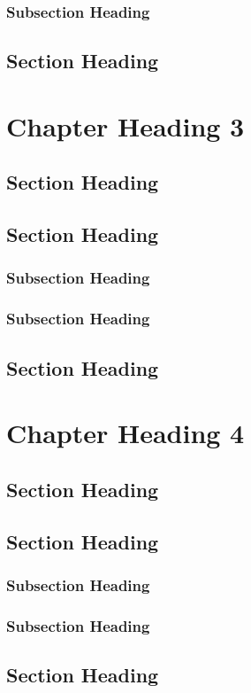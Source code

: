 \documentclass[teachingmaterial]{aaltoseries}
\begin{document}
\subsection{Subsection Heading}
\lipsum[9-10]
\section{Section Heading}
\lipsum[11-12]

\chapter[Alternative Chapter 3 Heading]{Chapter Heading 3}
\section{Section Heading}
\lipsum[1-4]
\section{Section Heading}
\lipsum[5-6]
\subsection{Subsection Heading}
\lipsum[7-8]
\subsection{Subsection Heading}
\lipsum[9-10]
\section{Section Heading}
\lipsum[11-12]

\chapter{Chapter Heading 4}
\section{Section Heading}
\lipsum[1-4]
\section{Section Heading}
\lipsum[5-6]
\subsection{Subsection Heading}
\lipsum[7-8]
\subsection{Subsection Heading}
\lipsum[9-10]
\section{Section Heading}
\lipsum[11-12]
\end{document}
